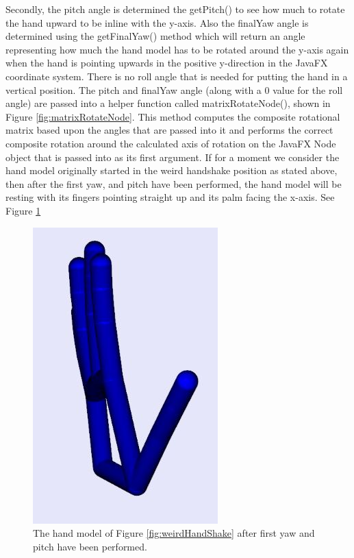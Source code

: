 Secondly, the pitch angle is determined the getPitch() to see how much to rotate the hand upward to be inline with the y-axis. Also the finalYaw angle is determined using the getFinalYaw() method which will return an angle representing how much the hand model has to be rotated around the y-axis again when the hand is pointing upwards in the positive y-direction in the JavaFX coordinate system. There is no roll angle that is needed for putting the hand in a vertical position. The pitch and finalYaw angle (along with a 0 value for the roll angle) are passed into a helper function called matrixRotateNode(), shown in Figure \ref{fig:matrixRotateNode}. This method computes the composite rotational matrix based upon the angles that are passed into it and performs the correct composite rotation around the calculated axis of rotation on the JavaFX Node object that is passed into as its first argument. If for a moment we consider the hand model originally started in the weird handshake position as stated above, then after the first yaw, and pitch have been performed, the hand model will be resting with its fingers pointing straight up and its palm facing the x-axis. See Figure \ref{fig:afterPitch}
\begin{figure}[H]
\centering
\includegraphics[scale=0.35]{Figures/4_afterPitch.JPG}
\caption[After Pitch]{The hand model of Figure \ref{fig:weirdHandShake} after first yaw and pitch have been performed.}
\label{fig:afterPitch}
\end{figure}

